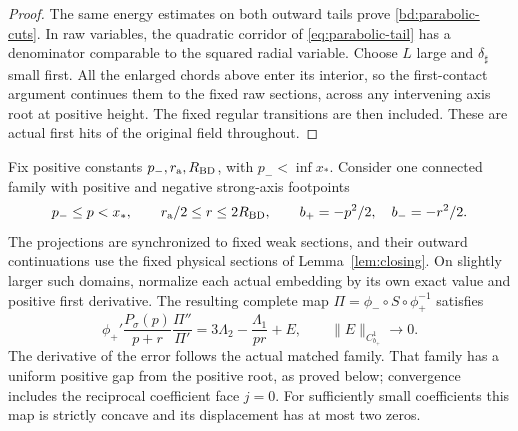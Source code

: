 \begin{proof}
The same energy estimates on both outward tails prove
\eqref{bd:parabolic-cuts}.  In raw variables, the quadratic corridor
of \eqref{eq:parabolic-tail} has a denominator comparable to the
squared radial variable.  Choose \(L\) large and
\(\delta_\sharp\) small first.  All the enlarged chords above enter
its interior, so the first-contact argument continues them to the
fixed raw sections, across any intervening axis root at positive
height.  The fixed regular transitions are then included.  These
are actual first hits of the original field throughout.
\end{proof}

\begin{lemma}
\label{bd:lem-annulus}
Fix positive constants \(p_-,r_{\rm a},R_{\rm BD}\), with
\(p_-<\inf x_*\).  Consider one connected family with positive and
negative strong-axis footpoints
\[
 p_-\le p<x_*,\qquad r_{\rm a}/2\le r\le2R_{\rm BD},
 \qquad b_+=-p^2/2,\quad b_-=-r^2/2.
\]
The projections are synchronized to fixed weak sections, and their
outward continuations use the fixed physical sections of
Lemma~\ref{lem:closing}.  On slightly larger such domains, normalize
each actual embedding by its own exact value and positive first
derivative.  The resulting complete map
\(\Pi=\phi_-\circ S\circ\phi_+^{-1}\) satisfies
\begin{equation}\label{bd:annular-curvature}
 \phi_+'\frac{P_\sigma(p)}{p+r}\frac{\Pi''}{\Pi'}
 =3\Lambda_2-\frac{\Lambda_1}{pr}+E,\qquad
 \|E\|_{C^1_{b_+}}\longrightarrow0 .
\end{equation}
The derivative of the error follows the actual matched family.
That family has a uniform positive gap from the positive root, as
proved below; convergence includes the reciprocal coefficient face
\(j=0\). For sufficiently small coefficients this map is strictly concave and its displacement
has at most two zeros.
\end{lemma}
